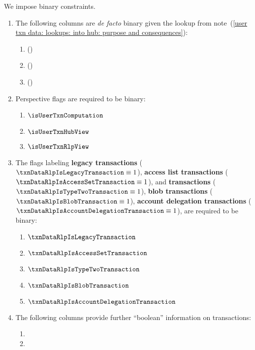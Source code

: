 We impose binary constraints.
\begin{enumerate}
	\item
		The following columns are \emph{de facto} binary given the lookup from
		note~(\ref{user txn data: lookups: into hub: purpose and consequences}):
		\begin{enumerate}
			\item \sysi{} \quad (\sanityCheck)
			\item \user{} \quad (\sanityCheck)
			\item \sysf{} \quad (\sanityCheck)
		\end{enumerate}
	\item
		Perspective flags are required to be binary:
		\begin{enumerate}
			\item $\isUserTxnComputation$
			\item $\isUserTxnHubView$
			\item $\isUserTxnRlpView$
		\end{enumerate}
	\item
		The flags labeling
		\textbf{legacy transactions}             ($\txnDataRlpIsLegacyTransaction            \equiv 1$),
		\textbf{access list transactions}        ($\txnDataRlpIsAccessSetTransaction         \equiv 1$), and
		\textbf{\cite{EIP-1559} transactions}    ($\txnDataRlpIsTypeTwoTransaction           \equiv 1$),
		\textbf{blob transactions}               ($\txnDataRlpIsBlobTransaction              \equiv 1$),
		\textbf{account delegation transactions} ($\txnDataRlpIsAccountDelegationTransaction \equiv 1$),
		are required to be binary:
		\begin{enumerate}
			\item $\txnDataRlpIsLegacyTransaction            $
			\item $\txnDataRlpIsAccessSetTransaction         $
			\item $\txnDataRlpIsTypeTwoTransaction           $
			\item $\txnDataRlpIsBlobTransaction              $
			\item $\txnDataRlpIsAccountDelegationTransaction $
		\end{enumerate}
	\item
		The following columns provide further ``boolean'' information on transactions:
		\begin{enumerate}
			\item \txnDataHubIsDeployment           {}
			\item \txnDataHubHasTypeTwoGasSemantics {}

\end{enumerate}
\end{enumerate}
